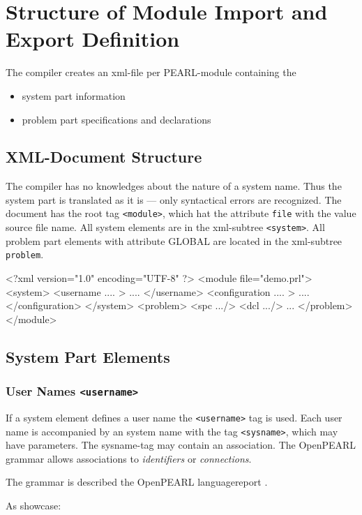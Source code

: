 \chapter{Structure of Module Import and Export Definition}

The compiler creates an xml-file per PEARL-module containing the
\begin{itemize}
\item system part information
\item problem part specifications and declarations
\end{itemize}

\section{XML-Document Structure}
The compiler has no knowledges about the nature of a system name.
Thus the system part is translated as it is --- only syntactical errors
are recognized. 
The document has the root tag \verb|<module>|, which hat the attribute
\verb|file| with the value source file name.  
All system elements are in the xml-subtree \verb|<system>|.
All problem part elements with attribute GLOBAL are located
in the xml-subtree \verb|problem|.

\begin{XMLCode}
<?xml version="1.0" encoding="UTF-8" ?>
<module file="demo.prl">
<system>
   <username .... >
   ....
   </username>
   <configuration .... >
   ....
   </configuration>
</system>
<problem>
  <spc .../>
  <dcl .../>
  ...
</problem>
</module>
\end{XMLCode}

\section{System Part Elements}
\subsection{User Names \texttt{<username>}}
If a system element defines a user name the \verb|<username>| tag is 
used. Each user name is accompanied by an system name with the tag 
\verb|<sysname>|, which may have parameters.
The sysname-tag may contain an association.
The OpenPEARL grammar allows associations to \textit{identifiers} or \textit{connections}.

The grammar is described the OpenPEARL languagereport \cite{p_report}.

As showcase:

